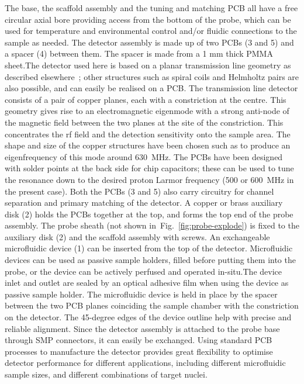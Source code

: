 \documentclass[preprint,5p]{elsarticle}
\newcommand{\fig}[1]{Fig.~\ref{#1}}
\begin{document}
The base, the scaffold assembly and the tuning and matching PCB all have a free circular
axial bore providing access from the bottom of the probe, which can be used for
temperature and environmental control and/or fluidic connections to the sample as
needed. The detector assembly is made up of two PCBs (3 and 5) and a spacer (4) between them. \cbstart The spacer is made from a 1 mm thick PMMA sheet.\cbend  The detector used here is based on a planar transmission line geometry as described elsewhere~\cite{gream_2016,stripline_jan}; other structures such as spiral
coils and Helmholtz pairs are also possible, and can easily be realised on a PCB.
The transmission line detector consists of a pair of copper
planes, each with a constriction at the centre.  This geometry gives rise to an
electromagnetic eigenmode with a strong anti-node of the magnetic field between
the two planes at the site of the constriction. This concentrates the rf field
and the detection sensitivity
onto the sample area.
The shape and size of the copper structures have been chosen such as to produce
an eigenfrequency of this mode around 630~MHz. The PCBs have been designed with
solder points at the back side for chip capacitors; these can be used to tune the
resonance down to the desired proton Larmor frequency (500 or 600~MHz in the present case).
Both the PCBs (3 and 5) also carry circuitry for channel separation and primary
matching of the detector. A copper or brass auxiliary disk (2) holds the PCBs
together at the top, and forms the top end of the probe assembly.
The probe sheath (not shown in~\fig{fig:probe-explode}) is fixed to the auxiliary disk (2)
and the scaffold assembly with screws.
An exchangeable microfluidic device (1) can be inserted from the top of the detector.
Microfluidic devices can be used as passive sample holders, filled before putting them
into the probe,
or the device can be actively perfused and operated in-situ.\cbstart The device inlet and outlet are sealed by an optical adhesive film when using the device as passive sample holder.\cbend
 The microfluidic device is held in place by the spacer
between the two PCB planes coinciding the sample chamber with the constriction on the
detector.  The 45-degree edges of the device outline help with precise and reliable
alignment.
Since the detector assembly is attached to the probe base through SMP
connectors, it can easily be exchanged.
Using standard PCB processes to manufacture the detector provides great flexibility
to optimise detector performance for different applications, including different
microfluidic sample sizes, and different combinations of target nuclei.
\end{document}
